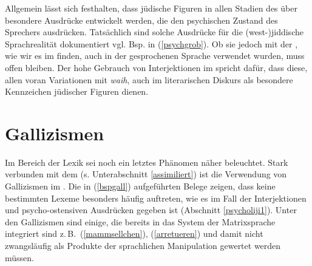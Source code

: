 Allgemein lässt sich festhalten, dass jüdische Figuren in allen Stadien des \hai{{\LiJi}} über besondere Ausdrücke entwickelt werden, die den psychischen Zustand des Sprechers ausdrücken.
Tatsächlich sind solche Ausdrücke für die (west-)jiddische Sprachrealität dokumentiert vgl. Bsp. in (\ref{psychgrob}). Ob sie jedoch mit der , wie wir es im  finden, auch in der gesprochenen Sprache verwendet wurden, muss offen bleiben. Der hohe Gebrauch von Interjektionen im  spricht dafür, dass diese, allen voran Variationen mit \textit{waih}, auch im literarischen Diskurs als besondere Kennzeichen jüdischer Figuren dienen.

\section{Gallizismen}\label{galliliji1}
Im Bereich der Lexik sei noch ein letztes Phänomen näher beleuchtet. Stark verbunden mit dem  \parencite[175]{Gelber1986} (s. Unterabschnitt \ref{assimiliert}) ist die Verwendung von Gallizismen im .
Die in (\ref{bspgall}) aufgeführten Belege zeigen, dass keine bestimmten Lexeme besonders häufig auftreten, wie es im Fall der Interjektionen und psycho-ostensiven Ausdrücken gegeben ist (Abschnitt \ref{psycholiji1}). Unter den Gallizismen sind einige, die bereits in das System der Matrixsprache integriert sind z.\,B.\, (\ref{mammsellchen}), (\ref{arretueren}) und damit nicht zwangsläufig als Produkte der sprachlichen Manipulation gewertet werden müssen. 

\label{bspgall}

